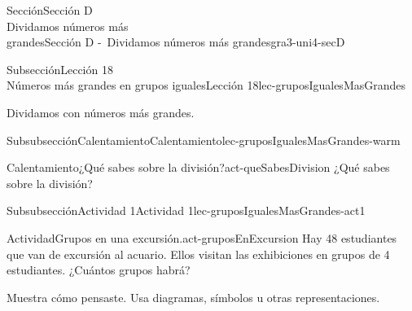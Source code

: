 %
%
\typeout{************************************************}
\typeout{************************************************}
%
\begin{sectionptx}{Sección}{{\Large Sección D\\}Dividamos números más\\grandes}{}{Sección D -~Dividamos números más grandes}{}{}{gra3-uni4-secD}
\vspace*{-3ex}
%
%
\typeout{************************************************}
\typeout{************************************************}
%
\begin{subsectionptx}{Subsección}{{\normalsize Lección 18\\[-0.05cm]}Números más grandes en grupos iguales}{}{Lección 18}{}{}{lec-gruposIgualesMasGrandes}
\begin{introduction}{}%
Dividamos con números más grandes.%
\end{introduction}%
%
%
\typeout{************************************************}
\typeout{************************************************}
%
\begin{subsubsectionptx}{Subsubsección}{Calentamiento}{}{Calentamiento}{}{}{lec-gruposIgualesMasGrandes-warm}
\begin{exploration}{Calentamiento}{¿Qué sabes sobre la división?}{act-queSabesDivision}%
¿Qué sabes sobre la división?%
\end{exploration}%
\end{subsubsectionptx}
%
%
\typeout{************************************************}
\typeout{************************************************}
%
\begin{subsubsectionptx}{Subsubsección}{Actividad 1}{}{Actividad 1}{}{}{lec-gruposIgualesMasGrandes-act1}
\begin{activity}{Actividad}{Grupos en una excursión.}{act-gruposEnExcursion}%
Hay 48 estudiantes que van de excursión al acuario. Ellos visitan las exhibiciones en grupos de 4 estudiantes. ¿Cuántos grupos habrá?%
\par
Muestra cómo pensaste. Usa diagramas, símbolos u otras representaciones.%

\end{activity}
\end{subsubsectionptx}
\end{subsectionptx}
\end{sectionptx}
